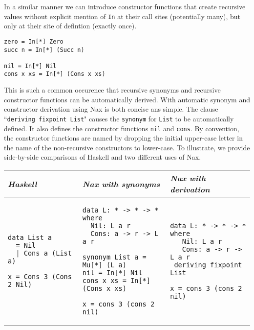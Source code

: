 In a similar manner we can introduce constructor functions that create
recursive values without explicit mention of \verb+In+ at their
call sites (potentially many), but only at their site of defintion (exactly once).

{\small
\begin{verbatim}
zero = In[*] Zero
succ n = In[*] (Succ n)

nil = In[*] Nil
cons x xs = In[*] (Cons x xs)
\end{verbatim}}
This is such a common occurence that recursive synonyms and recursive constructor functions
can be automatically derived. With automatic synonym and constructor derivation
using Nax is both concise ans simple. The clause ``\verb+deriving fixpoint List+"
causes the \verb+synonym+ for \verb+List+ to be automatically defined. It
also defines the constructor functions \verb+nil+ and \verb+cons+.
By convention, the constructor functions are named by dropping the initial
upper-case letter in the name of the non-recursive constructors to lower-case.
To illustrate, we provide side-by-side comparisons
of Haskell and two different uses of Nax.

\vspace*{0.1in}
\begin{tabular}{l|l|l}
{\em Haskell}  & {\em Nax with synonyms} &  {\em Nax with derivation} \\ \hline
\begin{minipage}[t]{.26\linewidth}
{\small
\begin{verbatim}
data List a 
  = Nil 
  | Cons a (List a)
  
x = Cons 3 (Cons 2 Nil)  
\end{verbatim}}
\end{minipage}

& 

\begin{minipage}[t]{.34\linewidth}
{\small
\begin{verbatim}
data L: * -> * -> * where
  Nil: L a r
  Cons: a -> r -> L a r
  
synonym List a = Mu[*] (L a)
nil = In[*] Nil
cons x xs = In[*] (Cons x xs)

x = cons 3 (cons 2 nil)  
\end{verbatim}}
\end{minipage}

&

\begin{minipage}[t]{.26\linewidth}
{\small
\begin{verbatim}
data L: * -> * -> * where
   Nil: L a r
   Cons: a -> r -> L a r
 deriving fixpoint List

x = cons 3 (cons 2 nil)    
\end{verbatim}}
\end{minipage}

\end{tabular}


